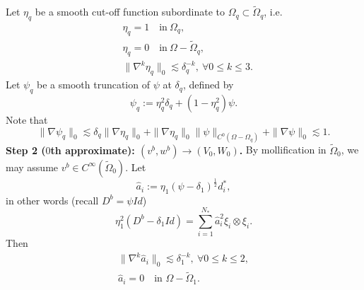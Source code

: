 \documentclass[reqno,12pt]{amsart}
\numberwithin{equation}{section}
\theoremstyle{plain}
\theoremstyle{definition}
\begin{document}
Let $\eta_q$ be a smooth cut-off function subordinate to $\Omega_q\subset\tilde\Omega_q$, i.e.
\begin{align*}
    &\eta_q=1\quad\text{in}\ \Omega_q,\\
    &\eta_q=0\quad\text{in}\ \Omega-\tilde\Omega_q,\\
    &\|\nabla^k \eta_q\|_0\lesssim \delta_{q}^{-k},\ \forall 0\le k\le 3.
\end{align*}
Let $\psi_q$ be a smooth truncation of $\psi$ at $\delta_q$, defined by
\begin{equation}
\psi_{q}:=\eta_q^2\delta_{q}+(1-\eta_q^2)\psi.
\end{equation}
Note that
\begin{equation*}
    \|\nabla\psi_q\|_0\lesssim \delta_q \|\nabla\eta_q\|_0 + \|\nabla\eta_q\|_0\|\psi\|_{C^0(\Omega-\Omega_q)} +\|\nabla\psi\|_0\lesssim 1.
\end{equation*}
\textbf{Step 2 ($0$th approximate): $(v^b,w^b)\to(V_0,W_0)$.}
By mollification in $\tilde\Omega_0$, we may assume $v^b\in C^\infty(\tilde\Omega_0)$. Let
\begin{equation*}
    \hat a_i:=\eta_1(\psi-\delta_1)^\frac{1}{2}d_i^*,
\end{equation*}
in other words (recall $D^b=\psi Id$)
\begin{equation}\label{z0002}
    \eta_1^2(D^b-\delta_1 Id)=\sum_{i=1}^{N_*}\hat a_i^2\xi_i\otimes\xi_i.
\end{equation}
Then
\begin{gather}
    \|\nabla^k\hat a_i\|_0\lesssim \delta_1^{-k},\ \forall0\le k\le 2, \label{996}\\
    \hat{a}_i = 0 \quad\text{in }\Omega-\tilde\Omega_1. \label{2020}
\end{gather}
\end{document}
